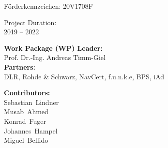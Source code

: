 {\begin{center}
		\begin{minipage}[h][2em][b]{0.49\textwidth}
			\begin{flushleft}
				Förderkennzeichen: 20V1708F
			\end{flushleft}
		\end{minipage}
		\begin{minipage}[h][2em][b]{0.49\textwidth}
			\begin{flushright}
				Project Duration:\\2019 -- 2022
			\end{flushright}
		\end{minipage}
		\noindent\makebox[\linewidth]{\rule{\textwidth}{0.4pt}}
		\begin{minipage}[h][6em][b]{0.44\textwidth}
			\begin{flushleft}
				\textbf{Work Package (WP) Leader:}\\Prof. Dr.-Ing. Andreas Timm-Giel
				\\
				\textbf{Partners:}\\DLR, Rohde \& Schwarz, NavCert, f.u.n.k.e, BPS, iAd
			\end{flushleft}
		\end{minipage}
		\begin{minipage}[h][7em][b]{0.54\textwidth}
			\begin{flushright}
				\textbf{Contributors:}\\\mbox{Sebastian Lindner}\\\mbox{Musab Ahmed}\\\mbox{Konrad Fuger}\\\mbox{Johannes Hampel}\\\mbox{Miguel Bellido}
			\end{flushright}
		\end{minipage}
	\end{center}
	\newpage
}
\makeatother

\title{}
\date{August, 2022}
\maketitle
\newpage
\def\fps@figure{htbp}